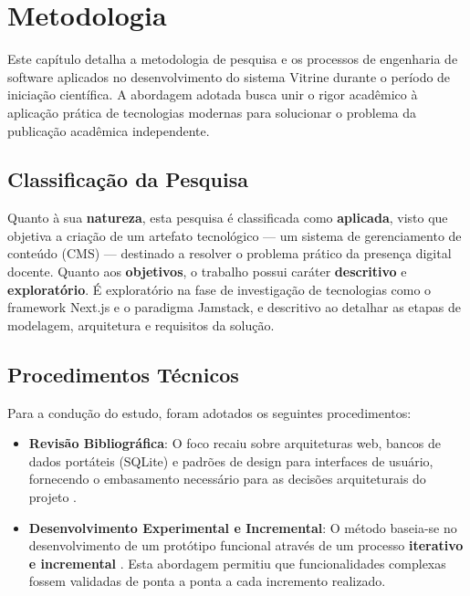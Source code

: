 \chapter{Metodologia}\label{cap:Metodologia}

Este capítulo detalha a metodologia de pesquisa e os processos de engenharia de software aplicados no desenvolvimento do sistema Vitrine durante o período de iniciação científica. A abordagem adotada busca unir o rigor acadêmico à aplicação prática de tecnologias modernas para solucionar o problema da publicação acadêmica independente.

\section{Classificação da Pesquisa}

Quanto à sua \textbf{natureza}, esta pesquisa é classificada como \textbf{aplicada}, visto que objetiva a criação de um artefato tecnológico — um sistema de gerenciamento de conteúdo (CMS) — destinado a resolver o problema prático da presença digital docente. Quanto aos \textbf{objetivos}, o trabalho possui caráter \textbf{descritivo} e \textbf{exploratório}. É exploratório na fase de investigação de tecnologias como o framework Next.js e o paradigma Jamstack, e descritivo ao detalhar as etapas de modelagem, arquitetura e requisitos da solução.

\section{Procedimentos Técnicos}

Para a condução do estudo, foram adotados os seguintes procedimentos:

\begin{itemize}
    \item \textbf{Revisão Bibliográfica}: O foco recaiu sobre arquiteturas web, bancos de dados portáteis (SQLite) e padrões de design para interfaces de usuário, fornecendo o embasamento necessário para as decisões arquiteturais do projeto \cite{ref7}.
    \item \textbf{Desenvolvimento Experimental e Incremental}: O método baseia-se no desenvolvimento de um protótipo funcional através de um processo \textbf{iterativo e incremental} \cite{Sommerville2011}. Esta abordagem permitiu que funcionalidades complexas fossem validadas de ponta a ponta a cada incremento realizado.
\end{itemize}

